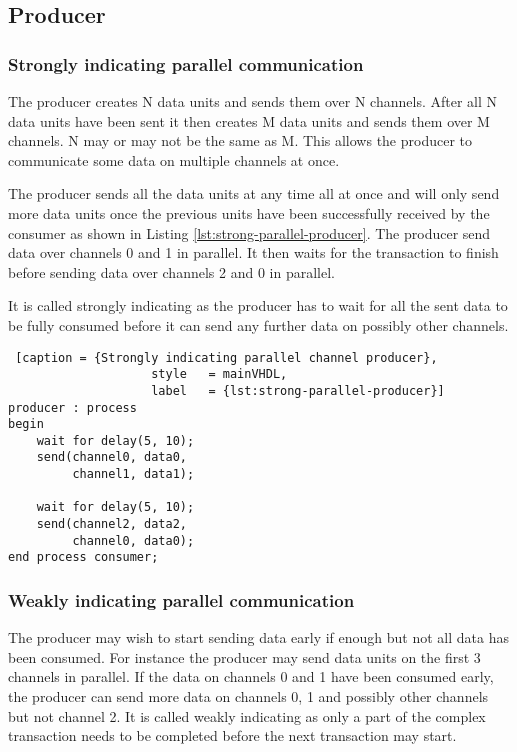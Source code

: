 \documentclass{report}
\begin{document}
\subsection{Producer}

\subsubsection{Strongly indicating parallel communication}

The producer creates N data units and sends them over N channels. After all N
data units have been sent it then creates M data units and sends them over M
channels. N may or may not be the same as M. This allows the producer to
communicate some data on multiple channels at once.

The producer sends all the data units at any time all at once and will only send
more data units once the previous units have been successfully received by the
consumer as shown in Listing \ref{lst:strong-parallel-producer}. The producer
send data over channels 0 and 1 in parallel. It then waits for the transaction
to finish before sending data over channels 2 and 0 in parallel.

It is called strongly indicating as the producer has to wait for all the sent
data to be fully consumed before it can send any further data on possibly other
channels.

\begin{lstlisting} [caption = {Strongly indicating parallel channel producer},
                    style   = mainVHDL,
                    label   = {lst:strong-parallel-producer}]
producer : process
begin
    wait for delay(5, 10);
    send(channel0, data0,
         channel1, data1);

    wait for delay(5, 10);
    send(channel2, data2,
         channel0, data0);
end process consumer;
\end{lstlisting}

\subsubsection{Weakly indicating parallel communication}

The producer may wish to start sending data early if enough but not all data has
been consumed. For instance the producer may send data units on the first 3
channels in parallel. If the data on channels 0 and 1 have been consumed early,
the producer can send more data on channels 0, 1 and possibly other channels but
not channel 2. It is called weakly indicating as only a part of the complex
transaction needs to be completed before the next transaction may start.
\end{document}
